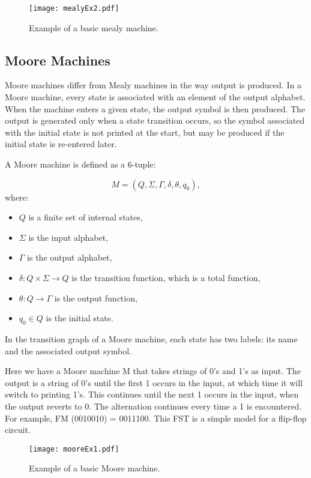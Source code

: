 \begin{figure}[htbp]
    \centering
    \texttt{[image: mealyEx2.pdf]}
    \caption{Example of a basic mealy machine.}
    \label{fig:3}
\end{figure}


\subsection{Moore Machines}

Moore machines differ from Mealy machines in the way output is produced. In a Moore machine, every state is associated with an element of the output alphabet. 
When the machine enters a given state, the output symbol is then produced. The output is generated only when a state transition occurs, 
so the symbol associated with the initial state is not printed at the start, but may be produced if the initial state is re-entered later.

A Moore machine is defined as a 6-tuple:

\[
M = (Q, \Sigma, \Gamma, \delta, \theta, q_0),
\]
where:
\begin{itemize}
    \item $Q$ is a finite set of internal states,
    \item $\Sigma$ is the input alphabet,
    \item $\Gamma$ is the output alphabet,
    \item $\delta: Q \times \Sigma \rightarrow Q$ is the transition function, which is a total function,
    \item $\theta: Q \rightarrow \Gamma$ is the output function,
    \item $q_0 \in Q$ is the initial state.
\end{itemize}

In the transition graph of a Moore machine, each state has two labels: its name and the associated output symbol.

Here we have a Moore machine M that takes strings of 0's and 1's as input. The output is a string of
0's until the first 1 occurs in the input, at which time it will switch to printing 1's. This continues
until the next 1 occurs in the input, when the output reverts to 0. The alternation continues
every time a 1 is encountered. For example, FM (0010010) = 0011100. This FST is a simple model for
a flip-flop circuit.

\begin{figure}[htbp]
    \centering
    \texttt{[image: mooreEx1.pdf]}
    \caption{Example of a basic Moore machine.}
    \label{fig:4}
\end{figure}

